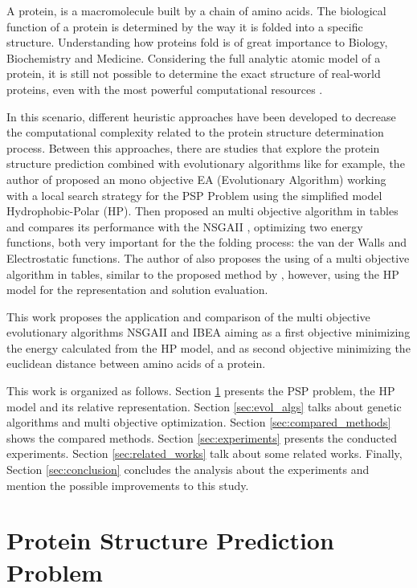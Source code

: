 \documentclass[conference]{IEEEtran}
\begin{document}
A protein, is a macromolecule built by a chain of amino acids. The biological function of a protein is determined by the way it is folded into a specific structure. Understanding how proteins fold is of great importance to Biology, Biochemistry and Medicine. Considering the full analytic atomic model of a protein, it is still not possible to determine the exact structure of real-world proteins, even with the most powerful computational resources \cite{lopes2008evolutionary}.


In this scenario, different heuristic approaches have been developed to decrease the computational complexity related to the protein structure determination process. Between this approaches, there are studies that explore the protein structure prediction combined with evolutionary algorithms like for example, the author of \cite{li2012genetic} proposed an mono objective EA (Evolutionary Algorithm) working with a local search strategy for the PSP Problem using the simplified model Hydrophobic-Polar (HP). Then \cite{soares2011investigating} proposed an multi objective algorithm in tables and compares its performance with the NSGAII \cite{deb2002fast}, optimizing two energy functions, both very important for the the folding process: the van der Walls and Electrostatic functions. The author of \cite{gabriel2012algoritmos} also proposes the using of a multi objective algorithm in tables, similar to the proposed method by \cite{soares2011investigating}, however, using the HP model for the representation and solution evaluation.


This work proposes the application and comparison of the multi objective evolutionary algorithms NSGAII and IBEA \cite{zitzler2004indicator} aiming as a first objective minimizing the energy calculated from the HP model, and as second objective minimizing the euclidean distance between amino acids of a protein.


This work is organized as follows. Section \ref{sec:psp_problem} presents the PSP problem, the HP model and its relative representation. Section \ref{sec:evol_algs} talks about genetic algorithms and multi objective optimization. Section \ref{sec:compared_methods} shows the compared methods. Section \ref{sec:experiments} presents the conducted experiments. Section \ref{sec:related_works} talk about some related works. Finally, Section \ref{sec:conclusion} concludes the analysis about the experiments and mention the possible improvements to this study.


\section{Protein Structure Prediction Problem}
\label{sec:psp_problem}
\end{document}
